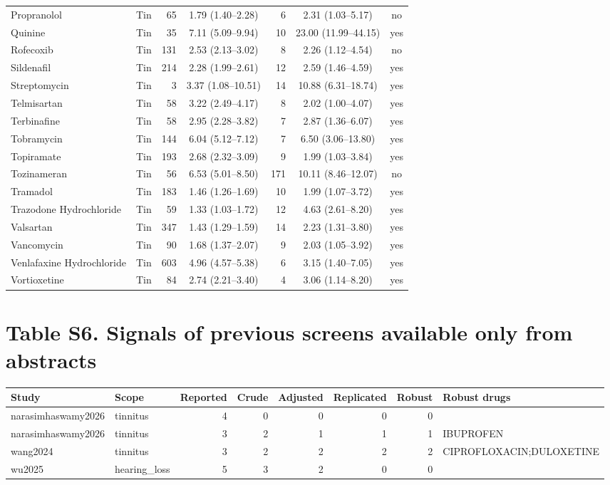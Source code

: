 \documentclass[10pt]{article}
\begin{document}
{\begin{longtable}{lcrcrcc}
Propranolol & Tin & 65 & 1.79 (1.40--2.28) & 6 & 2.31 (1.03--5.17) & no \\
Quinine & Tin & 35 & 7.11 (5.09--9.94) & 10 & 23.00 (11.99--44.15) & yes \\
Rofecoxib & Tin & 131 & 2.53 (2.13--3.02) & 8 & 2.26 (1.12--4.54) & no \\
Sildenafil & Tin & 214 & 2.28 (1.99--2.61) & 12 & 2.59 (1.46--4.59) & yes \\
Streptomycin & Tin & 3 & 3.37 (1.08--10.51) & 14 & 10.88 (6.31--18.74) & yes \\
Telmisartan & Tin & 58 & 3.22 (2.49--4.17) & 8 & 2.02 (1.00--4.07) & yes \\
Terbinafine & Tin & 58 & 2.95 (2.28--3.82) & 7 & 2.87 (1.36--6.07) & yes \\
Tobramycin & Tin & 144 & 6.04 (5.12--7.12) & 7 & 6.50 (3.06--13.80) & yes \\
Topiramate & Tin & 193 & 2.68 (2.32--3.09) & 9 & 1.99 (1.03--3.84) & yes \\
Tozinameran & Tin & 56 & 6.53 (5.01--8.50) & 171 & 10.11 (8.46--12.07) & no \\
Tramadol & Tin & 183 & 1.46 (1.26--1.69) & 10 & 1.99 (1.07--3.72) & yes \\
Trazodone Hydrochloride & Tin & 59 & 1.33 (1.03--1.72) & 12 & 4.63 (2.61--8.20) & yes \\
Valsartan & Tin & 347 & 1.43 (1.29--1.59) & 14 & 2.23 (1.31--3.80) & yes \\
Vancomycin & Tin & 90 & 1.68 (1.37--2.07) & 9 & 2.03 (1.05--3.92) & yes \\
Venlafaxine Hydrochloride & Tin & 603 & 4.96 (4.57--5.38) & 6 & 3.15 (1.40--7.05) & yes \\
Vortioxetine & Tin & 84 & 2.74 (2.21--3.40) & 4 & 3.06 (1.14--8.20) & yes \\
\bottomrule
\end{longtable}}

\section*{Table S6. Signals of previous screens available only from abstracts}
\begin{longtable}{llrrrrrp{6cm}}
\toprule
Study & Scope & Reported & Crude & Adjusted & Replicated & Robust & Robust drugs \\
\midrule
narasimhaswamy2026 & tinnitus & 4 & 0 & 0 & 0 & 0 &  \\
narasimhaswamy2026 & tinnitus & 3 & 2 & 1 & 1 & 1 & IBUPROFEN \\
wang2024 & tinnitus & 3 & 2 & 2 & 2 & 2 & CIPROFLOXACIN;DULOXETINE \\
wu2025 & hearing\_loss & 5 & 3 & 2 & 0 & 0 &  \\
\bottomrule
\end{longtable}
\end{document}
